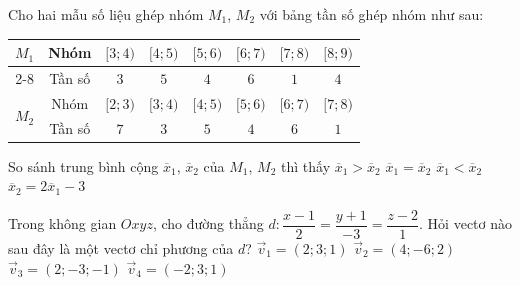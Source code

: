 \begin{ex}%
	Cho hai mẫu số liệu ghép nhóm $M_1$, $M_2$ với bảng tần số ghép nhóm như sau:
	\begin{center}
		\begin{tabular}{|c|c|c|c|c|c|c|c|}
			\hline
			\multirow{2}{*}{$M_1$} & Nhóm & $[3;4)$ & $[4;5)$ & $[5;6)$ & $[6;7)$ & $[7;8)$ & $[8;9)$ \\
			\cline{2-8}
			& Tần số & $3$ & $5$ & $4$ & $6$ & $1$ & $4$ \\
			\hline
			\multirow{2}{*}{$M_2$} & Nhóm & $[2;3)$ & $[3;4)$ & $[4;5)$ & $[5;6)$ & $[6;7)$ & $[7;8)$ \\
			\cline{2-8}
			& Tần số & $7$ & $3$ & $5$ & $4$ & $6$ & $1$ \\
			\hline
		\end{tabular}
	\end{center}
	So sánh trung bình cộng $\overline{x}_1$, $\overline{x}_2$ của $M_1$, $M_2$ thì thấy
	\choice
	{\True $\overline{x}_1 > \overline{x}_2$}
	{$\overline{x}_1 = \overline{x}_2$}
	{$\overline{x}_1 < \overline{x}_2$}
	{$\overline{x}_2 = 2\overline{x}_1 - 3$}
\end{ex}

\begin{ex}%
	Trong không gian $Oxyz$, cho đường thẳng $d \colon \dfrac{x-1}{2}=\dfrac{y+1}{-3}=\dfrac{z-2}{1}$. Hỏi vectơ nào sau đây là một vectơ chỉ phương của $d$?
	\choice
	{$\overrightarrow{v}_1 = (2; 3; 1)$}
	{\True $\overrightarrow{v}_2 = (4; -6; 2)$}
	{$\overrightarrow{v}_3 = (2; -3; -1)$}
	{$\overrightarrow{v}_4 = (-2; 3; 1)$}
\end{ex}

